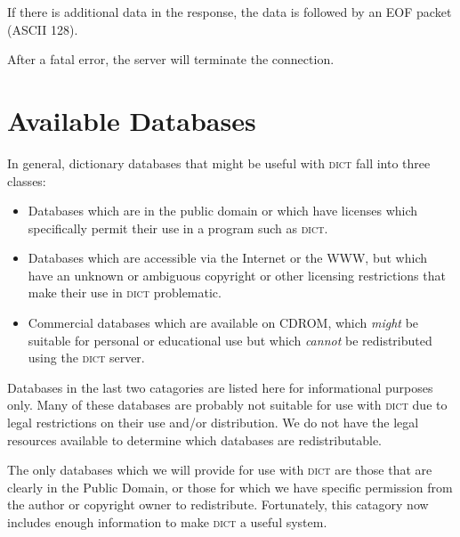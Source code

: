 \documentclass{article}
\newcommand{\note}{\bigskip\par\noindent}
\newcommand{\dict}{\textsc{dict}\xspace}
\begin{document}
\note If there is additional data in the response, the data is followed by
an EOF packet (ASCII 128).

After a fatal error, the server will terminate the connection.

\section{Available Databases}

In general, dictionary databases that might be useful with \dict fall into
three classes:
\begin{itemize}
\item Databases which are in the public domain or which have licenses which
  specifically permit their use in a program such as \dict.
\item Databases which are accessible via the Internet or the WWW, but which
  have an unknown or ambiguous copyright or other licensing restrictions
  that make their use in \dict problematic.
\item Commercial databases which are available on CDROM, which \emph{might}
  be suitable for personal or educational use but which \emph{cannot} be
  redistributed using the \dict server.
\end{itemize}

Databases in the last two catagories are listed here for informational
purposes only.  Many of these databases are probably not suitable for use
with \dict due to legal restrictions on their use and/or distribution.  We
do not have the legal resources available to determine which databases are
redistributable.

The only databases which we will provide for use with \dict are those that
are clearly in the Public Domain, or those for which we have specific
permission from the author or copyright owner to redistribute.
Fortunately, this catagory now includes enough information to make \dict a
useful system.
\end{document}
